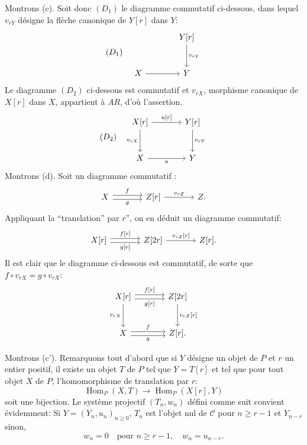 \documentclass[11pt]{article}
\DeclareMathOperator{\Hom}{Hom}
\providecommand{\Hom}{\operatorname{Hom}}
\providecommand{\cC}{\mathcal C}
\providecommand{\cC}{\mathcal C}
\providecommand{\Hom}{\operatorname{Hom}}
\begin{document}
Montrons (c). Soit donc $(D_1)$ le diagramme commutatif ci-dessous, dans lequel $v_{rY}$ désigne la flèche canonique de $Y[r]$ dans $Y$:
\[
(D_1)\quad
\begin{tikzcd}[column sep=large,row sep=large]
& Y[r] \arrow[d,"{v_{rY}}"]\\
X \arrow[r] & Y
\end{tikzcd}
\]
Le diagramme $(D_2)$ ci-dessous est commutatif et $v_{rX}$, morphisme canonique de $X[r]$ dans $X$, appartient à $AR$, d'où l'assertion.
\[
(D_2)\quad
\begin{tikzcd}[column sep=large,row sep=large]
X[r] \arrow[r,"{u[r]}"] \arrow[d,"{v_{rX}}"'] & Y[r] \arrow[d,"{v_{rY}}"]\\
X \arrow[r,"u"'] & Y
\end{tikzcd}
\]
Montrons (d). Soit un diagramme commutatif :
\[
\begin{tikzcd}[column sep=large]
X \arrow[r,shift left,"f"] \arrow[r,shift right,"g"'] & Z[r] \arrow[r,"{v_{rZ}}"] & Z .
\end{tikzcd}
\]
Appliquant la ``translation'' par $r$'', on en déduit un diagramme commutatif:
\[
\begin{tikzcd}[column sep=large]
X[r] \arrow[r,shift left,"{f[r]}"] \arrow[r,shift right,"{g[r]}"'] & Z[2r] \arrow[r,"{v_{rZ}[r]}"] & Z[r].
\end{tikzcd}
\]
Il est clair que le diagramme ci-dessous est commutatif, de sorte que $f\circ v_{rX}=g\circ v_{rX}$:
\[
\begin{tikzcd}[column sep=large,row sep=large]
X[r] \arrow[r,shift left,"{f[r]}"] \arrow[r,shift right,"{g[r]}"'] \arrow[d,"{v_{rX}}"'] & Z[2r] \arrow[d,"{v_{rZ}[r]}"]\\
X \arrow[r,shift left,"f"] \arrow[r,shift right,"g"'] & Z[r] .
\end{tikzcd}
\]

Montrons (c'). Remarquons tout d'abord que si $Y$ désigne un objet de $P$ et $r$ un entier positif, il existe un objet $T$ de $P$ tel que $Y=T[r]$ et tel que pour tout objet $X$ de $P$, l'homomorphisme de translation par $r$:
\[
\Hom_P(X,T)\longrightarrow\Hom_P(X[r],Y)
\]
soit une bijection. Le système projectif $(T_n,w_n)$ défini comme suit convient évidemment:
Si $Y=(Y_n,u_n)_{n\ge 0}$, $T_n$ est l'objet nul de $\cC$ pour $n\ge r-1$ et $Y_{n-r}$ sinon,
\[
w_n=0\quad\text{pour } n\ge r-1,\quad w_n=u_{n-r}.
\]
\end{document}
